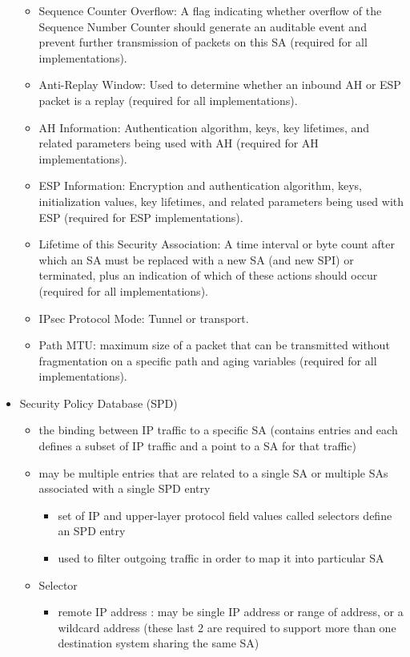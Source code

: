 \documentclass{article}
\begin{document}
\begin{itemize}
\begin{itemize}
        \item Sequence Counter Overflow: A flag indicating whether overflow of the Sequence Number Counter should generate an auditable event and prevent further transmission of packets on this SA (required for all implementations).
        \item Anti-Replay Window: Used to determine whether an inbound AH or ESP packet is a replay (required for all implementations).
        \item AH Information: Authentication algorithm, keys, key lifetimes, and related parameters being used with AH (required for AH implementations).
        \item ESP Information: Encryption and authentication algorithm, keys, initialization values, key lifetimes, and related parameters being used with ESP (required for ESP implementations).
        \item Lifetime of this Security Association: A time interval or byte count after which an SA must be replaced with a new SA (and new SPI) or terminated, plus an indication of which of these actions should occur (required for all implementations).
        \item IPsec Protocol Mode: Tunnel or transport. 
        \item Path MTU: maximum size of a packet that can be transmitted without fragmentation on a specific path and aging variables (required for all implementations). 
    \end{itemize}
    \item Security Policy Database (SPD)
    \begin{itemize}
        \item the binding between IP traffic to a specific SA (contains entries and each defines a subset of IP traffic and a point to a SA for that traffic)
        \item may be multiple entries that are related to a single SA or multiple SAs associated with a single SPD entry
        \begin{itemize}
            \item set of IP and upper-layer protocol field values called selectors define an SPD entry
            \item used to filter outgoing traffic in order to map it into particular SA
        \end{itemize}
        \item Selector
        \begin{itemize}
            \item remote IP address : may be single IP address or range of address, or a wildcard address (these last 2 are required to support more than one destination system sharing the same SA)

\end{itemize}
\end{itemize}
\end{itemize}
\end{document}
